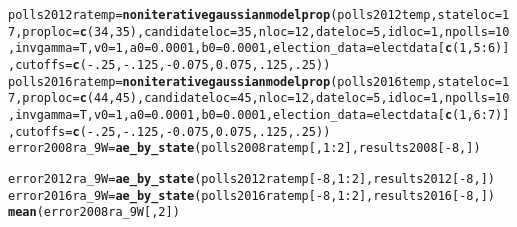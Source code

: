\documentclass{article}\usepackage[]{graphicx}\usepackage[]{color}
\makeatletter
\newcommand{\hlnum}[1]{\textcolor[rgb]{0.686,0.059,0.569}{#1}}%
\newcommand{\hlopt}[1]{\textcolor[rgb]{0,0,0}{#1}}%
\newcommand{\hlstd}[1]{\textcolor[rgb]{0.345,0.345,0.345}{#1}}%
\newcommand{\hlkwb}[1]{\textcolor[rgb]{0.69,0.353,0.396}{#1}}%
\newcommand{\hlkwc}[1]{\textcolor[rgb]{0.333,0.667,0.333}{#1}}%
\newcommand{\hlkwd}[1]{\textcolor[rgb]{0.737,0.353,0.396}{\textbf{#1}}}%
\newenvironment{kframe}{%
 \def\at@end@of@kframe{}%
 \ifinner\ifhmode%
  \def\at@end@of@kframe{\end{minipage}}%
  \begin{minipage}{\columnwidth}%
 \fi\fi%
 \def\FrameCommand##1{\hskip\@totalleftmargin \hskip-\fboxsep
 \colorbox{shadecolor}{##1}\hskip-\fboxsep
     \hskip-\linewidth \hskip-\@totalleftmargin \hskip\columnwidth}%
 \MakeFramed {\advance\hsize-\width
   \@totalleftmargin\z@ \linewidth\hsize
   \@setminipage}}%
 {\par\unskip\endMakeFramed%
 \at@end@of@kframe}
\newenvironment{knitrout}{}{} %
\makeatother
\begin{document}
\begin{knitrout}
\begin{kframe}
\begin{alltt}
\hlstd{polls2012ratemp} \hlkwb{=} \hlkwd{noniterativegaussianmodelprop}\hlstd{(polls2012temp,} \hlkwc{stateloc} \hlstd{=} \hlnum{17}\hlstd{,} \hlkwc{proploc} \hlstd{=} \hlkwd{c}\hlstd{(}\hlnum{34}\hlstd{,} \hlnum{35}\hlstd{),} \hlkwc{candidateloc} \hlstd{=} \hlnum{35}\hlstd{,}  \hlkwc{nloc} \hlstd{=} \hlnum{12}\hlstd{,} \hlkwc{dateloc} \hlstd{=} \hlnum{5}\hlstd{,} \hlkwc{idloc} \hlstd{=} \hlnum{1}\hlstd{,}  \hlkwc{npolls} \hlstd{=} \hlnum{10}\hlstd{,}\hlkwc{invgamma} \hlstd{= T,} \hlkwc{v0}\hlstd{=}\hlnum{1}\hlstd{,} \hlkwc{a0}\hlstd{=}\hlnum{0.0001}\hlstd{,} \hlkwc{b0}\hlstd{=}\hlnum{0.0001}\hlstd{,}  \hlkwc{election_data} \hlstd{= electdata[}\hlkwd{c}\hlstd{(}\hlnum{1}\hlstd{,} \hlnum{5}\hlopt{:}\hlnum{6}\hlstd{)],} \hlkwc{cutoffs} \hlstd{=} \hlkwd{c}\hlstd{(}\hlopt{-}\hlnum{.25}\hlstd{,} \hlopt{-}\hlnum{.125}\hlstd{,} \hlopt{-}\hlnum{0.075}\hlstd{,} \hlnum{0.075}\hlstd{,} \hlnum{.125}\hlstd{,} \hlnum{.25}\hlstd{))}
\hlstd{polls2016ratemp} \hlkwb{=} \hlkwd{noniterativegaussianmodelprop}\hlstd{(polls2016temp,} \hlkwc{stateloc} \hlstd{=} \hlnum{17}\hlstd{,} \hlkwc{proploc} \hlstd{=} \hlkwd{c}\hlstd{(}\hlnum{44}\hlstd{,} \hlnum{45}\hlstd{),} \hlkwc{candidateloc} \hlstd{=} \hlnum{45}\hlstd{,} \hlkwc{nloc} \hlstd{=} \hlnum{12}\hlstd{,} \hlkwc{dateloc} \hlstd{=} \hlnum{5}\hlstd{,} \hlkwc{idloc} \hlstd{=} \hlnum{1}\hlstd{,}\hlkwc{npolls} \hlstd{=} \hlnum{10}\hlstd{,} \hlkwc{invgamma} \hlstd{= T,} \hlkwc{v0}\hlstd{=}\hlnum{1}\hlstd{,} \hlkwc{a0}\hlstd{=}\hlnum{0.0001}\hlstd{,} \hlkwc{b0}\hlstd{=}\hlnum{0.0001}\hlstd{,} \hlkwc{election_data} \hlstd{= electdata[}\hlkwd{c}\hlstd{(}\hlnum{1}\hlstd{,} \hlnum{6}\hlopt{:}\hlnum{7}\hlstd{)],} \hlkwc{cutoffs} \hlstd{=} \hlkwd{c}\hlstd{(}\hlopt{-}\hlnum{.25}\hlstd{,} \hlopt{-}\hlnum{.125}\hlstd{,} \hlopt{-}\hlnum{0.075}\hlstd{,} \hlnum{0.075}\hlstd{,} \hlnum{.125}\hlstd{,} \hlnum{.25}\hlstd{))}
\hlstd{error2008ra_9W} \hlkwb{=} \hlkwd{ae_by_state}\hlstd{(polls2008ratemp[,} \hlnum{1}\hlopt{:}\hlnum{2}\hlstd{], results2008[}\hlopt{-}\hlnum{8}\hlstd{, ])}
\end{alltt}


{\ttfamily\noindent\color{warningcolor}{\#\# Warning in ae\_by\_state(polls2008ratemp[, 1:2], results2008[-8, ]): Predicted names do not match names of actual data}}

{\ttfamily\noindent\bfseries\color{errorcolor}{\#\# Error in ae\_by\_state(polls2008ratemp[, 1:2], results2008[-8, ]): Incompatiable dimensions of predicted and actual}}\begin{alltt}
\hlstd{error2012ra_9W} \hlkwb{=} \hlkwd{ae_by_state}\hlstd{(polls2012ratemp[}\hlopt{-}\hlnum{8}\hlstd{,} \hlnum{1}\hlopt{:}\hlnum{2}\hlstd{], results2012[}\hlopt{-}\hlnum{8}\hlstd{, ])}
\hlstd{error2016ra_9W} \hlkwb{=} \hlkwd{ae_by_state}\hlstd{(polls2016ratemp[}\hlopt{-}\hlnum{8}\hlstd{,} \hlnum{1}\hlopt{:}\hlnum{2}\hlstd{], results2016[}\hlopt{-}\hlnum{8}\hlstd{, ])}
\hlkwd{mean}\hlstd{(error2008ra_9W[,}\hlnum{2}\hlstd{])}
\end{alltt}



\end{kframe}
\end{knitrout}
\end{document}
